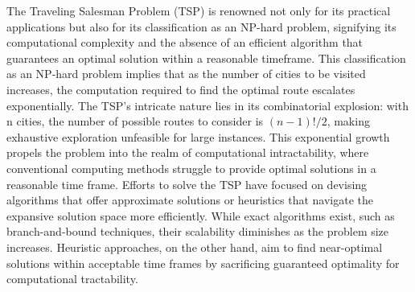 The Traveling Salesman Problem (TSP) is renowned not only for its practical applications but also for its classification as an NP-hard problem, signifying its computational complexity and the absence of an efficient algorithm that guarantees an optimal solution within a reasonable timeframe.\newline
This classification as an NP-hard problem implies that as the number of cities to be visited increases, the computation required to find the optimal route escalates exponentially. The TSP's intricate nature lies in its combinatorial explosion: with n cities, the number of possible routes to consider is $(n-1)!/2$, making exhaustive exploration unfeasible for large instances. This exponential growth propels the problem into the realm of computational intractability, where conventional computing methods struggle to provide optimal solutions in a reasonable time frame.\newline
Efforts to solve the TSP have focused on devising algorithms that offer approximate solutions or heuristics that navigate the expansive solution space more efficiently. While exact algorithms exist, such as branch-and-bound techniques, their scalability diminishes as the problem size increases. Heuristic approaches, on the other hand, aim to find near-optimal solutions within acceptable time frames by sacrificing guaranteed optimality for computational tractability.

